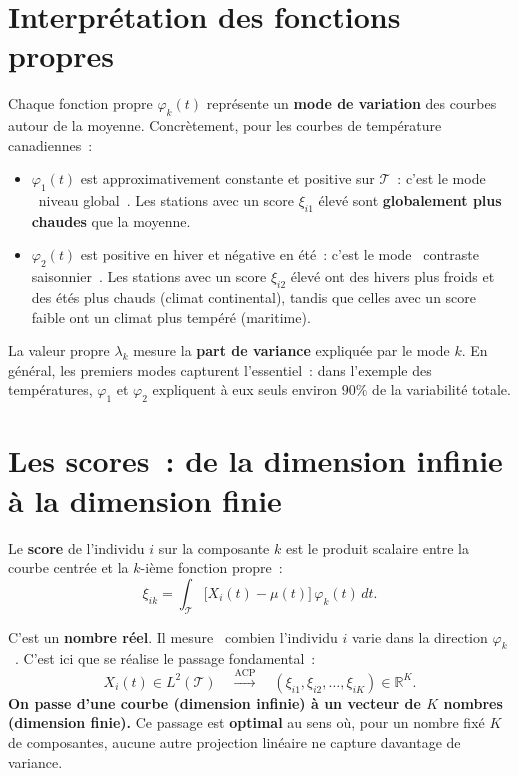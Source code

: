 \documentclass[11pt, a4paper]{article}
\newcommand{\R}{\mathbb{R}}
\newcommand{\Ltwo}{L^2(\mathcal{T})}
\begin{document}
\section{Interpr\'etation des fonctions propres}

Chaque fonction propre $\varphi_k(t)$ repr\'esente un \textbf{mode de variation} des courbes autour de la moyenne. Concr\`etement, pour les courbes de temp\'erature canadiennes~:

\begin{itemize}
    \item $\varphi_1(t)$ est approximativement constante et positive sur $\mathcal{T}$~: c'est le mode \guillemotleft~niveau global~\guillemotright. Les stations avec un score $\xi_{i1}$ \'elev\'e sont \textbf{globalement plus chaudes} que la moyenne.
    \item $\varphi_2(t)$ est positive en hiver et n\'egative en \'et\'e~: c'est le mode \guillemotleft~contraste saisonnier~\guillemotright. Les stations avec un score $\xi_{i2}$ \'elev\'e ont des hivers plus froids et des \'et\'es plus chauds (climat continental), tandis que celles avec un score faible ont un climat plus temp\'er\'e (maritime).
\end{itemize}

La valeur propre $\lambda_k$ mesure la \textbf{part de variance} expliqu\'ee par le mode $k$. En g\'en\'eral, les premiers modes capturent l'essentiel~: dans l'exemple des temp\'eratures, $\varphi_1$ et $\varphi_2$ expliquent \`a eux seuls environ $90\%$ de la variabilit\'e totale.

\section{Les scores~: de la dimension infinie \`a la dimension finie}

Le \textbf{score} de l'individu $i$ sur la composante $k$ est le produit scalaire entre la courbe centr\'ee et la $k$-i\`eme fonction propre~:
\[
    \xi_{ik} = \int_{\mathcal{T}} \bigl[X_i(t) - \mu(t)\bigr] \, \varphi_k(t) \, dt.
\]

C'est un \textbf{nombre r\'eel}. Il mesure \guillemotleft~combien l'individu $i$ varie dans la direction $\varphi_k$~\guillemotright. C'est ici que se r\'ealise le passage fondamental~:
\[
    X_i(t) \in \Ltwo \quad \xrightarrow{\text{ACP}} \quad (\xi_{i1}, \xi_{i2}, \ldots, \xi_{iK}) \in \R^K.
\]
\textbf{On passe d'une courbe (dimension infinie) \`a un vecteur de $K$ nombres (dimension finie).} Ce passage est \textbf{optimal} au sens o\`u, pour un nombre fix\'e $K$ de composantes, aucune autre projection lin\'eaire ne capture davantage de variance.
\end{document}
